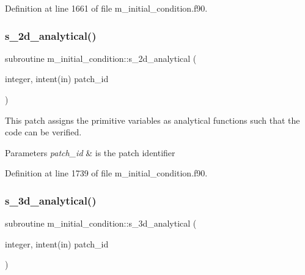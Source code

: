 Definition at line 1661 of file m\+\_\+initial\+\_\+condition.\+f90.

\mbox{\label{namespacem__initial__condition_a50f5727753c025d26925640a19259102}} 
\subsubsection{\texorpdfstring{s\+\_\+2d\+\_\+analytical()}{s\_2d\_analytical()}}
{\footnotesize\ttfamily subroutine m\+\_\+initial\+\_\+condition\+::s\+\_\+2d\+\_\+analytical (\begin{DoxyParamCaption}\item[{integer, intent(in)}]{patch\+\_\+id }\end{DoxyParamCaption})}



This patch assigns the primitive variables as analytical functions such that the code can be verified. 


\begin{DoxyParams}{Parameters}
{\em patch\+\_\+id} & is the patch identifier \\
\hline
\end{DoxyParams}


Definition at line 1739 of file m\+\_\+initial\+\_\+condition.\+f90.

\mbox{\label{namespacem__initial__condition_abb87c531b4d42302dd22863b95a7cdb2}} 
\subsubsection{\texorpdfstring{s\+\_\+3d\+\_\+analytical()}{s\_3d\_analytical()}}
{\footnotesize\ttfamily subroutine m\+\_\+initial\+\_\+condition\+::s\+\_\+3d\+\_\+analytical (\begin{DoxyParamCaption}\item[{integer, intent(in)}]{patch\+\_\+id }\end{DoxyParamCaption})}



